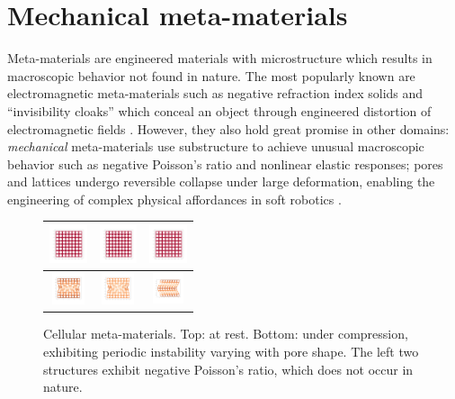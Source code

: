 \section{Mechanical meta-materials}
\label{sec:metamaterials}
Meta-materials are engineered materials with microstructure which results in macroscopic behavior not found in nature.
The most popularly known are electromagnetic meta-materials such as negative refraction index solids and ``invisibility cloaks'' which conceal an object through engineered distortion of electromagnetic fields \citep{poddubny2013hyperbolic,cai2010optical}.
However, they also hold great promise in other domains: \emph{mechanical} meta-materials use substructure to achieve unusual macroscopic behavior such as negative Poisson's ratio and nonlinear elastic responses; pores and lattices undergo reversible collapse under large deformation, enabling the engineering of complex physical affordances in soft robotics \citep{bertoldi2017flexible}.
\begin{figure}
\vspace{-0.2cm}
\centering
\begin{tabular}{c|c|c}
  		 {{\includegraphics[height=1.1cm, trim={3.5cm 3.5cm 3.5cm 3.5cm}, clip]{lces/figures/rest_pore_0} }}&
  		{{\includegraphics[height=1.1cm, trim={3.5cm 3.5cm 3.5cm 3.5cm}, clip]{lces/figures/rest_pore_01_-01} }}&%
  		{{\includegraphics[height=1.1cm, trim={3.5cm 3.5cm 3.5cm 3.5cm}, clip]{lces/figures/rest_pore_-01_01} }}\\\hline
  	\rule{0pt}{7ex}
{{\includegraphics[height=0.95cm, trim={3.5cm 4.5cm 3.5cm 4.5cm}, clip]{lces/figures/pore_0} }}&%
  		{{\includegraphics[height=0.95cm, trim={3.5cm 4.5cm 3.5cm 4.5cm}, clip]{lces/figures/pore_01_-01} }}&%
  		{{\includegraphics[height=0.9cm, trim={3.5cm 6cm 3.5cm 6cm}, clip]{lces/figures/pore_-01_01} }}%
  	\end{tabular}
  		\vspace{-0.2cm}%
  		\caption{\small Cellular meta-materials. Top: at rest. Bottom: under compression, exhibiting periodic instability varying with pore shape. The left two structures exhibit negative Poisson's ratio, which does not occur in nature.}%
  		\label{Fig:mms}%
\vspace{-0.4cm}
\end{figure}
